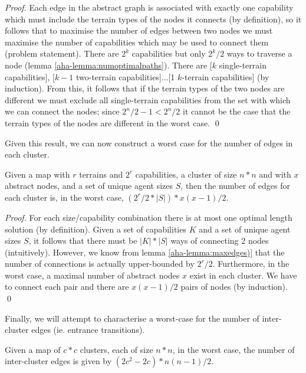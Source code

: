 \begin{proof}
Each edge in the abstract graph is associated with exactly one capability which must include the terrain types of the nodes it connects (by definition), so it follows that to maximise the number of edges between two nodes we must maximise the number of capabilities which may be used to connect them (problem statement). 
There are $2^k$ capabilities but only $2^k/2$ ways to traverse a node (lemma \ref{aha-lemma:numoptimalpaths}). There are [$k$ single-terrain capabilities], [$k-1$ two-terrain capabilities]...[1 $k$-terrain capabilities] (by induction). From this, it follows that if the terrain types of the two nodes are different we must exclude all single-terrain capabilities from the set with which we can connect the nodes; since $2^n/2 - 1 < 2^n/2$ it cannot be the case that the terrain types of the nodes are different in the worst case. \qed
\end{proof}
Given this result, we can now construct a worst case for the number of edges in each cluster.
\begin{lemma}
\label{aha-lemma:maxedgesincluster}
Given a map with $r$ terrains and $2^r$ capabilities, a cluster of size $n*n$ and with $x$ abstract nodes, and a set of unique agent sizes $S$, then the number of edges for each cluster is, in the worst case, $(2^r/2 * |S|) * x(x-1)/2$.
\end{lemma}

\begin{proof}
For each size/capability combination there is at most one optimal length solution (by definition). Given a set of capabilities $K$ and a set of unique agent sizes $S$, it follows that there must be $|K| * |S|$ ways of connecting 2 nodes (intuitively). However, we know from lemma \ref{aha-lemma:maxedges)} that the number of connections is actually upper-bounded by $2^r/2$. Furthermore, in the worst case, a maximal number of abstract nodes $x$ exist in each cluster. We have to connect each pair and there are $x(x-1)/2$ pairs of nodes (by induction). \qed
\end{proof}

Finally, we will attempt to characterise a worst-case for the number of inter-cluster edges (ie. entrance transitions). 
\begin{lemma}
\label{aha-lemma:maxtransitions}
Given a map of $c*c$ clusters, each of size $n*n$, in the worst case, the number of inter-cluster edges is given by $(2c^2 - 2c)*n(n-1)/2$.
\end{lemma}

